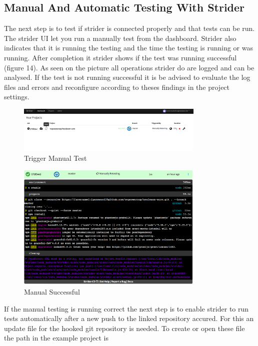 \subsection{Manual And Automatic Testing With Strider}
\label{Manual And Automatic Testing With Strider}
The next step is to test if strider is connected properly and that tests can be run. The strider UI let you run a manually test from
the dashboard. Strider also indicates that it is running the testing and the time the testing is running or was running. After completion
it strider shows if the test was running successful (figure 14). As seen on the picture all operations strider do are logged and can be
analysed. If the test is not running successful it is be advised to evaluate the log files and errors and reconfigure according to theses
findings in the project settings.

\begin{figure}[h!]
  \centering
  \includegraphics[width=0.8\textwidth]{images/manualTest.png}
  \caption{Trigger Manual Test}
\end{figure}

\begin{figure}[h!]
  \centering
  \includegraphics[width=0.8\textwidth]{images/successfulManualTest.png}
  \caption{Manual Successful}
\end{figure}

If the manual testing is running correct the next step is to enable strider to run tests automatically after a new push to the
linked repository accured. For this an update file for the hooked git repository is needed. To create or open these file the path in
the example project is

